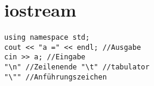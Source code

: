 \section{iostream}
\begin{lstlisting}
using namespace std;
cout << "a =" << endl; //Ausgabe
cin >> a; //Eingabe
"\n" //Zeilenende "\t" //tabulator
"\"" //Anführungszeichen
\end{lstlisting}



























